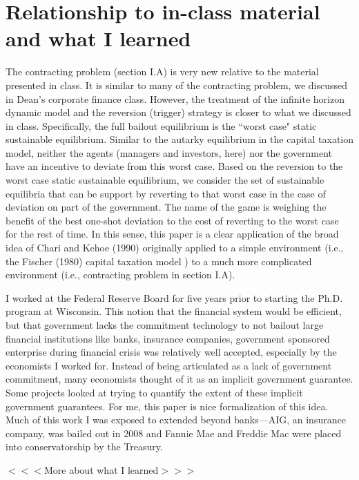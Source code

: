 \documentclass{article}
\begin{document}
\section{Relationship to in-class material and what I learned}

The contracting problem (section I.A) is very new relative to the material presented in class. It is similar to many of the contracting problem, we discussed in Dean's corporate finance class. However, the treatment of the infinite horizon dynamic model and the reversion (trigger) strategy is closer to what we discussed in class.  Specifically, the full bailout equilibrium is the ``worst case" static sustainable equilibrium.  Similar to the autarky equilibrium in the capital taxation model, neither the agents (managers and investors, here) nor the government have an incentive to deviate from this worst case.  Based on the reversion to the worst case static sustainable equilibrium, we consider the set of sustainable equilibria that can be support by reverting to that worst case in the case of deviation on part of the government.  The name of the game is weighing the benefit of the best one-shot deviation to the cost of reverting to the worst case for the rest of time.  In this sense, this paper is a clear application of the broad idea of Chari and Kehoe (1990) originally applied to a simple environment (i.e., the Fischer (1980) capital taxation model ) to a much more complicated environment (i.e., contracting problem in section I.A).

\bigskip

I worked at the Federal Reserve Board for five years prior to starting the Ph.D. program at Wisconsin.  This notion that the financial system would be efficient, but that government lacks the commitment technology to not bailout large financial institutions like banks, insurance companies, government sponsored enterprise during financial crisis was relatively well accepted, especially by the economists I worked for.  Instead of being articulated as a lack of government commitment, many economists thought of it as an implicit government guarantee. Some projects looked at trying to quantify the extent of these implicit government guarantees.  For me, this paper is nice formalization of this idea. Much of this work I was exposed to extended beyond banks---AIG, an insurance company, was bailed out in 2008 and Fannie Mae and Freddie Mac were placed into conservatorship by the Treasury.

\bigskip

$<<<$More about what I learned$>>>$
\end{document}
